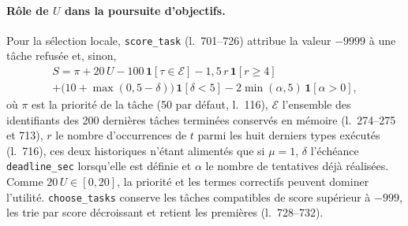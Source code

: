 \paragraph{Rôle de $U$ dans la poursuite d'objectifs.}
Pour la sélection locale, \texttt{score\_task} (l.~701--726) attribue la
valeur $-9999$ à une tâche refusée et, sinon,
\begin{multline*}
S = \pi + 20\,U
- 100\,\mathbf{1}[\tau \in \mathcal{E}]
- 1{,}5\,r\,\mathbf{1}[r \geq 4] \\
+ \bigl(10 + \max(0, 5 - \delta)\bigr)\,\mathbf{1}[\delta < 5]
- 2\min(\alpha, 5)\,\mathbf{1}[\alpha > 0],
\end{multline*}
où $\pi$ est la priorité de la tâche (50 par défaut, l.~116), $\mathcal{E}$
l'ensemble des identifiants des 200 dernières tâches terminées conservés en
mémoire (l.~274--275 et 713), $r$ le nombre
d'occurrences de $t$ parmi les huit derniers types exécutés (l.~716), ces deux
historiques n'étant alimentés que si $\mu = 1$,
$\delta$ l'échéance \texttt{deadline\_sec} lorsqu'elle est définie et
$\alpha$ le nombre de tentatives déjà réalisées. Comme $20\,U \in [0, 20]$, la
priorité et les termes correctifs peuvent dominer l'utilité.
\texttt{choose\_tasks} conserve les tâches compatibles de score supérieur à
$-999$, les trie par score décroissant et retient les premières (l.~728--732).


